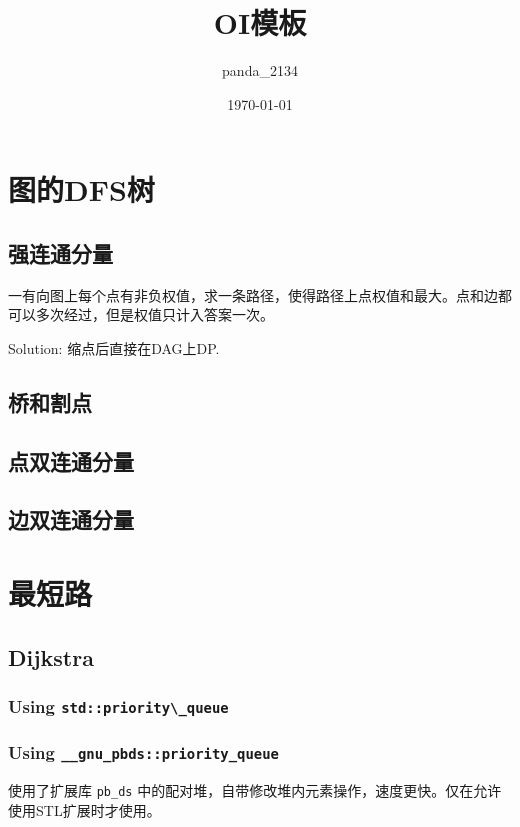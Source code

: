 \documentclass{article}
\title{OI模板}
\author{panda\_2134}
\date{\today}
\begin{document}
	\makeatletter
	\lst@CCPutMacro
    	\@empty\z@\@empty
	\makeatother

	\maketitle
	\newpage
	\tableofcontents
	\newpage

	\section{图的DFS树}
		\subsection{强连通分量}
		
		一有向图上每个点有非负权值，求一条路径，使得路径上点权值和最大。点和边都可以多次经过，但是权值只计入答案一次。
		
		Solution: 缩点后直接在DAG上DP.
		
		
		\subsection{桥和割点}
		\subsection{点双连通分量}
		\subsection{边双连通分量}

	\newpage
	\section{最短路}
		\subsection{Dijkstra}
			\subsubsection{Using \lstinline|std::priority\_queue|}
			
			\subsubsection{Using \lstinline|__gnu_pbds::priority_queue|}
			使用了扩展库 \lstinline|pb_ds| 中的配对堆，自带修改堆内元素操作，速度更快。仅在允许使用STL扩展时才使用。
			
\end{document}
